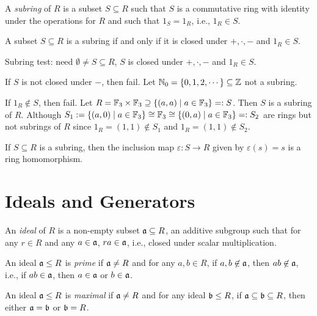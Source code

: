 \begin{definition}
    A \emph{subring} of $R$ is a subset $S \subseteq R$ such that $S$ is a commutative ring with identity under the operations for $R$ and such that $1_S = 1_R$, i.e., $1_R \in S$.
\end{definition}

\begin{fact}
    A subset $S \subseteq R$ is a subring if and only if it is closed under $+,\cdot,-$ and $1_R \in S$.
\end{fact}

\begin{example}
    Subring test: need $\emptyset \neq S \subseteq R$, $S$ is closed under $+,\cdot,-$ and $1_R \in S$. \par
    If $S$ is not closed under $-$, then fail. Let $\mathbb{N}_0 = \{0,1,2,\cdots\} \subseteq \mathbb{Z}$ not a subring. \par
    If $1_R \not \in S$, then fail. Let $R = \mathbb{F}_3 \times \mathbb{F}_3 \supseteq \{(a,a) \mid a \in \mathbb{F}_3\} =: S$. Then $S$ is a subring of $R$. Although $S_1 := \{(a,0) \mid a \in \mathbb{F}_3\} \cong \mathbb{F}_3 \cong \{(0,a) \mid a \in \mathbb{F}_3\} =: S_2$ are rings but not subrings of $R$ since $1_R = (1,1) \not \in S_1$ and $1_R = (1,1) \not \in S_2$. 
\end{example}

\begin{fact}
    If $S \subseteq R$ is a subring, then the inclusion map $\varepsilon: S \to R$ given by $\varepsilon(s) = s$ is a ring homomorphism.
\end{fact}

\section*{Ideals and Generators}

\begin{definition}
    An \emph{ideal} of $R$ is a non-empty subset $\mathfrak{a} \subseteq R$, an additive subgroup such that for any $r \in R$ and any $a \in \mathfrak{a}$, $ra \in \mathfrak{a}$, i.e., closed under scalar multiplication. \par
    An ideal $\mathfrak{a} \leq R$ is \emph{prime} if $\mathfrak{a} \neq R$ and for any $a,b \in R$, if $a,b \not \in \mathfrak{a}$, then $ab \not \in \mathfrak{a}$, i.e., if $ab \in \mathfrak{a}$, then $a \in \mathfrak{a}$ or $b \in \mathfrak{a}$. \par
    An ideal $\mathfrak{a} \leq R$ is \emph{maximal} if $\mathfrak{a} \neq R$ and for any ideal $\mathfrak{b} \leq R$, if $\mathfrak{a} \subseteq \mathfrak{b} \subseteq R$, then either $\mathfrak{a} = \mathfrak{b}$ or $\mathfrak{b} = R$.
\end{definition}

